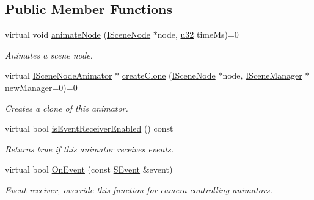 \subsection*{Public Member Functions}
\begin{DoxyCompactItemize}
\item 
virtual void \hyperlink{classirr_1_1scene_1_1ISceneNodeAnimator_ab2170d133db16de148d0f6841c06bc84}{animate\+Node} (\hyperlink{classirr_1_1scene_1_1ISceneNode}{I\+Scene\+Node} $\ast$node, \hyperlink{namespaceirr_a0416a53257075833e7002efd0a18e804}{u32} time\+Ms)=0
\begin{DoxyCompactList}\small\item\em Animates a scene node. \end{DoxyCompactList}\item 
virtual \hyperlink{classirr_1_1scene_1_1ISceneNodeAnimator}{I\+Scene\+Node\+Animator} $\ast$ \hyperlink{classirr_1_1scene_1_1ISceneNodeAnimator_a9cc261c12459fc7d3da6c2595d721c0d}{create\+Clone} (\hyperlink{classirr_1_1scene_1_1ISceneNode}{I\+Scene\+Node} $\ast$node, \hyperlink{classirr_1_1scene_1_1ISceneManager}{I\+Scene\+Manager} $\ast$new\+Manager=0)=0
\begin{DoxyCompactList}\small\item\em Creates a clone of this animator. \end{DoxyCompactList}\item 
virtual bool \hyperlink{classirr_1_1scene_1_1ISceneNodeAnimator_a37b22b8767dc6adca575223f02458740}{is\+Event\+Receiver\+Enabled} () const
\begin{DoxyCompactList}\small\item\em Returns true if this animator receives events. \end{DoxyCompactList}\item 
\mbox{\label{classirr_1_1scene_1_1ISceneNodeAnimator_aca20b841bb586cd9654464b001a7b6aa}} 
virtual bool \hyperlink{classirr_1_1scene_1_1ISceneNodeAnimator_aca20b841bb586cd9654464b001a7b6aa}{On\+Event} (const \hyperlink{structirr_1_1SEvent}{S\+Event} \&event)
\begin{DoxyCompactList}\small\item\em Event receiver, override this function for camera controlling animators. \end{DoxyCompactList}\item 
\mbox{\label{classirr_1_1scene_1_1ISceneNodeAnimator_a8d00cd0bc44945c617c0b8fa5c6ddcd5}} 

\end{DoxyCompactItemize}
